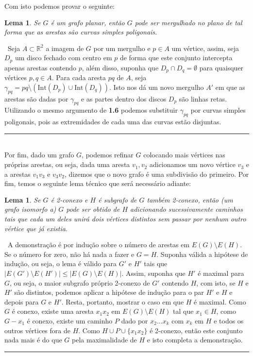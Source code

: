 \documentclass[12pt,a4paper]{article}
\newtheorem{lem}[mydef]{Lema}
\def\dem{\par\smallbreak\noindent {\textit{ Demonstração:}} \ }
\def\eop{\hfill\rule{2.5mm}{2.5mm} \\ }
\theoremstyle{definition}
\begin{document}
Com isto podemos provar o seguinte: 

\begin{lem}

    Se $G$ é um grafo planar, então $G$ pode ser mergulhado no plano de tal forma que as arestas são curvas simples poligonais.

\end{lem}

\dem Seja $A\subset \mathbb{R}^2$ a imagem de $G$ por um mergulho e $p\in A$ um vértice, assim, seja $D_p$ um disco fechado com centro em $p$ de forma que este conjunto intercepta apenas arestas contendo $p$, além disso, suponha que $D_p\cap D_q = \emptyset$ para quaisquer vértices $p,q\in A$. Para cada aresta $pq$ de $A$, seja $\gamma_{pq} = pq\setminus (\text{Int} (D_p)\cup \text{Int} (D_q))$. Isto nos dá um novo mergulho $A'$ em que as arestas são dadas por $\gamma_{pq}$ e as partes dentro dos discos $D_p$ são linhas retas. Utilizando o mesmo argumento de \textbf{1.6} podemos substituir $\gamma_{pq}$ por curvas simples poligonais, pois as extremidades de cada uma das curvas estão disjuntas. \eop

Por fim, dado um grafo $G$, podemos refinar $G$ colocando mais vértices nas próprias arestas, ou seja, dada uma aresta $v_1,v_2$ adicionamos um novo vértice $v_3$ e a arestas $v_1v_3$ e $v_3v_2$, dizemos que o novo grafo é uma subdivisão do primeiro. Por fim, temos o seguinte lema técnico que será necessário adiante: 

\begin{lem}

    Se $G$ é 2-conexo e $H$ é subgrafo de $G$ também 2-conexo, então (um grafo isomorfo a) $G$ pode ser obtido de $H$ adicionando sucessivamente caminhos tais que cada um deles unirá dois vértices distintos sem passar por nenhum outro vértice que já existia. 

\end{lem}

\dem A demonstração é por indução sobre o número de arestas em $E(G)\setminus E(H)$. Se o número for zero, não há nada a fazer e $G=H$. Suponha válida a hipótese de indução, ou seja, o lema é válido para $G'$ e $H'$ tais que $|E(G')\setminus E(H')|\leq |E(G)\setminus E(H)|$. Assim, suponha que $H'$ é maximal para $G$, ou seja, o maior subgrafo próprio 2-conexo de $G'$ contendo $H$, com isto, se $H$ e $H'$ são distintos, podemos aplicar a hipótese de indução para o par $H'$ e $H$ e depois para $G$ e $H'$. Resta, portanto, mostrar o caso em que $H$ é maximal. Como $G$ é conexo, existe uma aresta $x_1x_2$ em $E(G)\setminus E(H)$ tal que $x_1\in H$, como $G-x_1$ é conexo, existe um caminho $P$ dado por $x_2...x_k$ com $x_k$ em $H$ e todos os outros vértices fora de $H$. Como $H\cup P\cup \{x_1x_2\}$ é 2-conexo, então este conjunto nada mais é do que $G$ pela maximalidade de $H$ e isto completa a demonstração. \eop 
\end{document}
